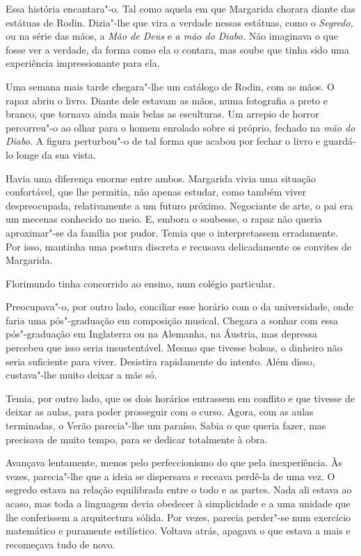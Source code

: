 Essa história encantara"-o. Tal como aquela em que Margarida chorara
diante das estátuas de Rodin. Dizia"-lhe que vira a verdade nessas
estátuas, como o \emph{Segredo, }ou na série das mãos, a \emph{Mão de
Deus }e\emph{ a mão do Diabo.} Não imaginava o que fosse ver a verdade,
da forma como ela o contara, mas soube que tinha sido uma experiência
impressionante para ela.

Uma semana mais tarde chegara"-lhe um catálogo de Rodin, com as mãos. O
rapaz abriu o livro. Diante dele estavam as mãos, numa fotografia a
preto e branco, que tornava ainda mais belas as esculturas. Um arrepio
de horror percorreu"-o ao olhar para o homem enrolado sobre si próprio,
fechado na \emph{mão do Diabo.} A figura perturbou"-o de tal forma que
acabou por fechar o livro e guardá-lo longe da sua vista.

Havia uma diferença enorme entre ambos. Margarida vivia uma situação
confortável, que lhe permitia, não apenas estudar, como também viver
despreocupada, relativamente a um futuro próximo. Negociante de arte, o
pai era um mecenas conhecido no meio. E, embora o soubesse, o rapaz não
queria aproximar"-se da família por pudor. Temia que o interpretassem
erradamente. Por isso, mantinha uma postura discreta e recusava
delicadamente os convites de Margarida.

Florimundo tinha concorrido ao ensino, num colégio particular.

Preocupava"-o, por outro lado, conciliar esse horário com o da
universidade, onde faria uma pós"-graduação em composição musical.
Chegara a sonhar com essa pós"-graduação em Inglaterra ou na Alemanha, na
Áustria, mas depressa percebeu que isso seria insustentável. Mesmo que
tivesse bolsas, o dinheiro não seria suficiente para viver. Desistira
rapidamente do intento. Além disso, custava"-lhe muito deixar a mãe só.

Temia, por outro lado, que os dois horários entrassem em conflito e que
tivesse de deixar as aulas, para poder prosseguir com o curso. Agora,
com as aulas terminadas, o Verão parecia"-lhe um paraíso. Sabia o que
queria fazer, mas precisava de muito tempo, para se dedicar totalmente à
obra.

Avançava lentamente, menos pelo perfeccionismo do que pela
inexperiência. Às vezes, parecia"-lhe que a ideia se dispersava e receava
perdê-la de uma vez. O segredo estava na relação equilibrada entre o
todo e as partes. Nada ali estava ao acaso, mas toda a linguagem devia
obedecer à simplicidade e a uma unidade que lhe conferissem a
arquitectura sólida. Por vezes, parecia perder"-se num exercício
matemático e puramente estilístico. Voltava atrás, apagava o que estava
a mais e recomeçava tudo de novo.


